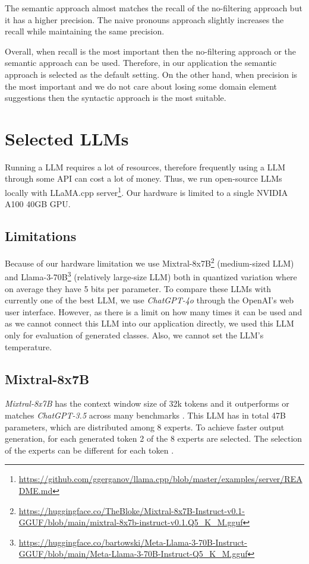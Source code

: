 The semantic approach almost matches the recall of the no-filtering approach but it has a higher precision. The naive pronouns approach slightly increases the recall while maintaining the same precision.

Overall, when recall is the most important then the no-filtering approach or the semantic approach can be used. Therefore, in our application the semantic approach is selected as the default setting. On the other hand, when precision is the most important and we do not care about losing some domain element suggestions then the syntactic approach is the most suitable.


\section{Selected LLMs}

Running a LLM requires a lot of resources, therefore frequently using a LLM through some API can cost a lot of money. Thus, we run open-source LLMs locally with LLaMA.cpp server\footnote{\url{https://github.com/ggerganov/llama.cpp/blob/master/examples/server/README.md}}. Our hardware is limited to a single NVIDIA A100 40GB GPU.


\subsection{Limitations}

Because of our hardware limitation we use Mixtral-8x7B\footnote{\url{https://huggingface.co/TheBloke/Mixtral-8x7B-Instruct-v0.1-GGUF/blob/main/mixtral-8x7b-instruct-v0.1.Q5_K_M.gguf}} (medium-sized LLM) \cite{Jiang2024} and Llama-3-70B\footnote{\url{https://huggingface.co/bartowski/Meta-Llama-3-70B-Instruct-GGUF/blob/main/Meta-Llama-3-70B-Instruct-Q5_K_M.gguf}} (relatively large-size LLM) both in quantized variation where on average they have 5 bits per parameter. To compare these LLMs with currently one of the best LLM, we use \textit{ChatGPT-4o} through the OpenAI's web user interface. However, as there is a limit on how many times it can be used and as we cannot connect this LLM into our application directly, we used this LLM only for evaluation of generated classes. Also, we cannot set the LLM's temperature.


\subsection{Mixtral-8x7B}

\emph{Mixtral-8x7B} has the context window size of 32k tokens and it outperforms or matches \emph{ChatGPT-3.5} across many benchmarks \cite{Jiang2024}. This LLM has in total 47B parameters, which are distributed among 8 experts. To achieve faster output generation, for each generated token 2 of the 8 experts are selected. The selection of the experts can be different for each token \cite{Jiang2024}.


